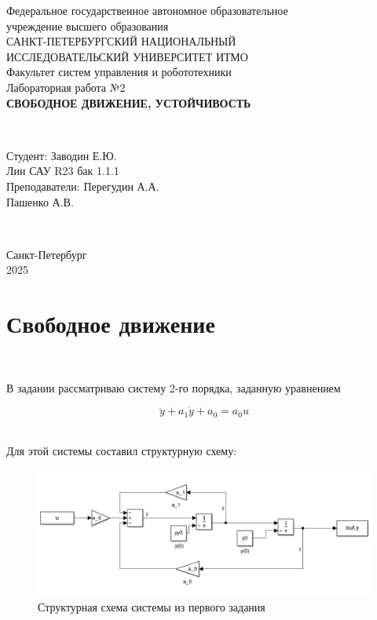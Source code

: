 \documentclass[a4paper]{article}
\begin{document}
\begin{titlepage}
    \begin{center}
        Федеральное государственное автономное образовательное \\ учреждение высшего образования \\[6pt]
        САНКТ-ПЕТЕРБУРГСКИЙ НАЦИОНАЛЬНЫЙ \\ ИССЛЕДОВАТЕЛЬСКИЙ УНИВЕРСИТЕТ ИТМО \\[16pt]
        Факультет систем управления и робототехники \\[26em]
        Лабораторная работа №2\\[0.5em]
        \textbf{СВОБОДНОЕ ДВИЖЕНИЕ, УСТОЙЧИВОСТЬ}
    \end{center}\,\\[10em]
    \begin{flushright}
        Студент: Заводин Е.Ю.\\
        Лин САУ R23 бак 1.1.1 \\[0.5em]
        Преподаватели: Перегудин А.А.\\
        Пашенко А.В.
    \end{flushright}\,\\[6em]
    \begin{center}
        {\small Санкт-Петербург \\ 2025}
    \end{center}
\end{titlepage}
\setcounter{page}{2}
\tableofcontents\newpage

\section{Свободное движение}\

В задании рассматриваю систему 2-го порядка, заданную уравнением 

$$
\ddot{y}+a_1\dot{y} + a_0=a_0 u
$$\

Для этой системы составил структурную схему:

\begin{figure}[H]
    \centering
    \includegraphics[width=0.75\linewidth]{ex1/scheme.png}
    \caption{Структурная схема системы из первого задания}
\end{figure}\ 
\end{document}
